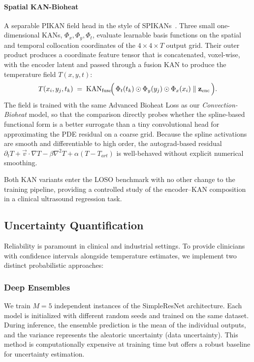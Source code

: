 \paragraph{Spatial KAN-Bioheat}
A separable PIKAN field head in the style of SPIKANs~\cite{jacob2025spikan}. Three small one-dimensional KANs, $\Phi_x,\Phi_y,\Phi_t$, evaluate learnable basis functions on the spatial and temporal collocation coordinates of the $4\times4\times T$ output grid. 
Their outer product produces a coordinate feature tensor that is concatenated, voxel-wise, with the encoder latent and passed through a fusion KAN to produce the temperature field $T(x,y,t)$:
\begin{equation}
    T(x_i, y_j, t_k) \;=\; \mathrm{KAN}_{\text{fuse}}\!\Bigl(\, \Phi_t(t_k)\odot\Phi_y(y_j)\odot\Phi_x(x_i)\;\Vert\;\mathbf{z}_{\text{enc}} \,\Bigr).
\end{equation}
The field is trained with the same Advanced Bioheat Loss as our \emph{Convection-Bioheat} model, so that the comparison directly probes whether the spline-based functional form is a better surrogate than a tiny convolutional head for approximating the PDE residual on a coarse grid. 
Because the spline activations are smooth and differentiable to high order, the autograd-based residual $\partial_t T + \vec{v}\!\cdot\!\nabla T - \beta\nabla^2 T + \alpha(T-T_{art})$ is well-behaved without explicit numerical smoothing.

Both KAN variants enter the LOSO benchmark with no other change to the training pipeline, providing a controlled study of the encoder--KAN composition in a clinical ultrasound regression task.







\subsection{Uncertainty Quantification}
Reliability is paramount in clinical and industrial settings. To provide clinicians with confidence intervals alongside temperature estimates, we implement two distinct probabilistic approaches:

\subsubsection{Deep Ensembles}
We train $M=5$ independent instances of the SimpleResNet architecture. Each model is initialized with different random seeds and trained on the same dataset. During inference, the ensemble prediction is the mean of the individual outputs, and the variance represents the aleatoric uncertainty (data uncertainty). This method is computationally expensive at training time but offers a robust baseline for uncertainty estimation.

